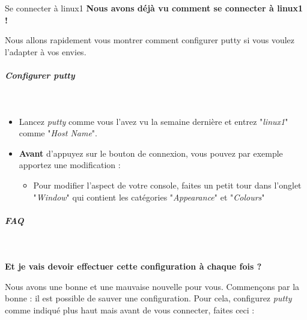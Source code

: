 \documentclass[a4paper,11pt]{article}
\begin{document}
\begin{Tutoriel}{Se connecter \`a linux1}
	\textbf{Nous avons d\'ej\`a vu comment se
		connecter \`a linux1 !}

	
	
	Nous allons rapidement vous montrer comment configurer putty 
	si vous voulez l'adapter \`a vos envies. 
	
	
		\subparagraph{Configurer putty} 

\textcolor{white}{.} \par

\par

\begin{itemize}
	
	\item 
	
	Lancez \textit{putty}
	comme vous l'avez vu la semaine derni\`ere et entrez
	"\textit{linux1}" comme
	"\textit{Host Name}".
	
	
	\item \textbf{Avant} d'appuyez
	sur le bouton de connexion, vous pouvez par exemple
	apportez une modification :  
	
	
	\begin{itemize}
		
		\item 
		
		Pour modifier l'aspect de votre console,
		faites un petit tour dans l'onglet "\textit{Window}" qui
		contient les cat\'egories "\textit{Appearance}" et
		"\textit{Colours}"
		
		
	\end{itemize}
	
\end{itemize}

	\end{Tutoriel}

		\subparagraph{FAQ} 

\textcolor{white}{.} \par

\par
\textbf{Et je vais devoir effectuer cette configuration \`a chaque fois ?}
\par

Nous avons une bonne et une mauvaise nouvelle pour vous. 
Commen\c cons par la bonne : il est possible de sauver une configuration.  
Pour cela, configurez \textit{putty} comme indiqu\'e plus haut 
mais avant de vous connecter, faites ceci :  

\par
\end{document}
